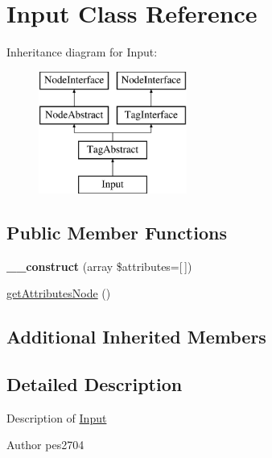 \hypertarget{class_pes_1_1_dom_1_1_node_1_1_tag_1_1_input}{}\section{Input Class Reference}
\label{class_pes_1_1_dom_1_1_node_1_1_tag_1_1_input}
Inheritance diagram for Input\+:\begin{figure}[H]
\begin{center}
\leavevmode
\includegraphics[height=4.000000cm]{class_pes_1_1_dom_1_1_node_1_1_tag_1_1_input}
\end{center}
\end{figure}
\subsection*{Public Member Functions}
\begin{DoxyCompactItemize}
\item 
\mbox{\label{class_pes_1_1_dom_1_1_node_1_1_tag_1_1_input_afe55bc1439758d475e70446a774807d9}} 
{\bfseries \+\_\+\+\_\+construct} (array \$attributes=\mbox{[}$\,$\mbox{]})
\item 
\mbox{\hyperlink{class_pes_1_1_dom_1_1_node_1_1_tag_1_1_input_a4722e7722b245351681b05d35f6694f3}{get\+Attributes\+Node}} ()
\end{DoxyCompactItemize}
\subsection*{Additional Inherited Members}


\subsection{Detailed Description}
Description of \mbox{\hyperlink{class_pes_1_1_dom_1_1_node_1_1_tag_1_1_input}{Input}}

\begin{DoxyAuthor}{Author}
pes2704 
\end{DoxyAuthor}


